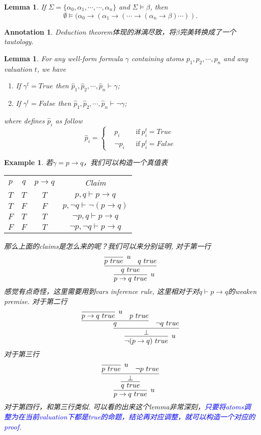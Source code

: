 \documentclass{article}
\theoremstyle{plain}
\newtheorem{lemma}[theorem]{Lemma}
\newtheorem{example}[theorem]{Example}
\newtheorem{annotation}[theorem]{Annotation}
\theoremstyle{nonumberplain}
\newcommand{\bluet}[1]{\textcolor{blue}{#1}}
\begin{document}
\begin{lemma}
\rm If $\Sigma =\{\alpha_0,\alpha_1,\cdots,\cdots,\alpha_n\} $ and $\Sigma \vDash \beta$, then
$$
\emptyset \vDash (\alpha_0 \to (\alpha_1 \to (\cdots \to (\alpha_n \to \beta)\cdots)).
$$
\end{lemma}

\begin{annotation}
\rm Deduction theorem体现的淋漓尽致，将$\beta$完美转换成了一个tautology. 
\end{annotation}

\begin{lemma}\label{how-to-construct-provable-formula}
\rm For any well-form formula $\gamma$ containing atoms $p_1,p_2,\cdots,p_n$ and any valuation $t$, we have 
\begin{enumerate}
	\item If $\gamma^t = True$ then $\widehat{p}_1,\widehat{p}_2,\cdots,\widehat{p}_n \vdash \gamma$;
	\item If $\gamma^t = False$ then $\widehat{p}_1,\widehat{p}_2,\cdots,\widehat{p}_n \vdash \neg\gamma$;
\end{enumerate}
where defines $\widehat{p}_i$ as follow
$$
\widehat{p}_i = \left\{
\begin{aligned}
&p_i && \text{if}~p_i^t = True \\
&\neg p_i && \text{if}~p_i^t = False
\end{aligned}
\right.
$$
\end{lemma}

\begin{example}
\rm 若$\gamma = p \to q$，我们可以构造一个真值表
\begin{center}
\begin{tabular}{|c|c|c|c|}
\hline
$p$ & $q$ & $p \to q$ & Claim \\ 
$T$ & $T$ & $T$ & $p , q \vdash p \to q$ \\
$T$ & $F$ & $F$ & $p , \neg q \vdash \neg(p \to q)$ \\
$F$ & $T$ & $T$ & $\neg p , q \vdash p \to q$ \\
$F$ & $F$ & $T$ & $\neg p , \neg q \vdash p \to q$ \\ 
\hline
\end{tabular}
\end{center}
那么上面的claims是怎么来的呢？我们可以来分别证明, 对于第一行
$$
\infer[u]{p \to q~true}{\infer{q~true}{\infer[u]{p~true}{} & q~true}}
$$
感觉有点奇怪，这里需要用到vars inference rule, 这里相对于对$q \vdash p \to q$的weaken premise. 对于第二行
$$
\infer[u]{\neg (p \to q)~true}{\infer{\perp}{\infer{q}{\infer[u]{p \to q~true}{} & p~true} & \neg q ~true}}
$$
对于第三行
$$
\infer[u]{p \to q~true}{\infer{q~true}{\infer{\perp}{\infer[u]{p~true}{} & \neg p ~true}}}
$$
对于第四行，和第三行类似. 可以看的出来这个lemma非常深刻，\bluet{只要将atoms调整为在当前valuation下都是true的命题，结论再对应调整，就可以构造一个对应的proof}. 
\end{example}
\end{document}
